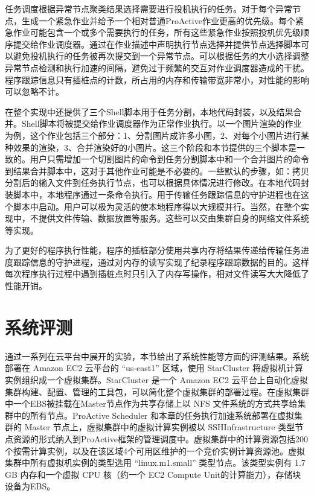 任务调度根据异常节点聚类结果选择需要进行投机执行的任务。对于每个异常节点，生成一个紧急作业并给予一个相对普通ProActive作业更高的优先级。每个紧急作业可能包含一个或多个需要执行的任务，所有这些紧急作业按照投机优先级顺序提交给作业调度器。通过在作业描述中声明执行节点选择并提供节点选择脚本可以避免投机执行的任务被再次提交到一个异常节点。可以根据任务的大小选择调整异常节点检测和执行加速的间隔，避免过于频繁的交互对作业调度器造成的干扰。程序跟踪信息只有插桩点的计数，所占用的内存和传输带宽非常小，对性能的影响可以忽略不计。

在整个实现中还提供了三个Shell脚本用于任务分割，本地代码封装，以及结果合并。Shell脚本将被提交给作业调度器作为正常作业执行。以一个图片渲染的作业为例，这个作业包括三个部分：1、分割图片成许多小图，2、对每个小图片进行某种效果的渲染，3、合并渲染好的小图片。这三个阶段和本节提供的三个脚本是一致的。用户只需增加一个切割图片的命令到任务分割脚本中和一个合并图片的命令到结果合并脚本中，这对于其他作业可能是不必要的。一些默认的步骤，如：拷贝分割后的输入文件到任务执行节点，也可以根据具体情况进行修改。在本地代码封装脚本中，本地程序通过一条命令执行。用于传输任务跟踪信息的守护进程也在这个脚本中启动。用户可以极为灵活的使本地程序得以大规模并行。当然，在整个实现中，不提供文件传输、数据放置等服务。这些可以交由集群自身的网络文件系统等实现。

为了更好的程序执行性能，程序的插桩部分使用共享内存将结果传递给传输任务进度跟踪信息的守护进程，通过对内存的读写实现了纪录程序跟踪数据的目的。这样每次程序执行过程中遇到插桩点时只引入了内存写操作，相对文件读写大大降低了性能开销。

\section{系统评测}
\label{sec:no2_eval}
通过一系列在云平台中展开的实验，本节给出了系统性能等方面的评测结果。系统部署在 Amazon EC2 云平台的 ``us-east1'' 区域，使用 StarCluster \cite{starcluster} 将虚拟机计算实例组织成一个虚拟集群。StarCluster \cite{starcluster} 是一个 Amazon EC2 云平台上自动化虚拟集群构建、配置、管理的工具包，可以简化整个虚拟集群的部署过程。在虚拟集群中一个EBS被挂载在Master节点作为共享存储上以 NFS 文件系统的方式共享给集群中的所有节点。ProActive Scheduler 和本章的任务执行加速系统部署在虚拟集群的 Master 节点上，虚拟集群中的虚拟计算实例被以 SSHInfrastructure 类型节点资源的形式纳入到ProActive框架的管理调度中。虚拟集群中的计算资源包括200个按需计算实例，以及在该区域4个可用区维护的一个竞价实例计算资源池。虚拟集群中所有虚拟机实例的类型选用 ``linux.m1.small'' 类型节点。该类型实例有 1.7 GB 内存和一个虚拟 CPU 核（约一个 EC2 Compute Unit的计算能力），存储块设备为EBS。

